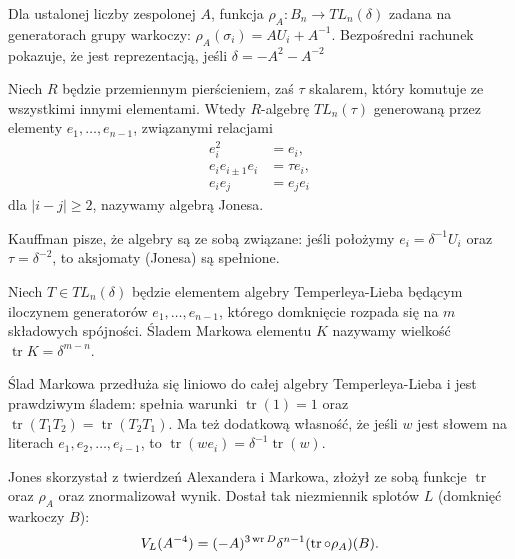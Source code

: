 Dla ustalonej liczby zespolonej $A$, funkcja $\rho_A \colon B_n \to TL_n(\delta)$ zadana na generatorach grupy warkoczy: $\rho_A(\sigma_i) = AU_i + A^{-1}$.
Bezpośredni rachunek pokazuje, że jest reprezentacją, jeśli $\delta = -A^2-A^{-2}$

\begin{definition}
%
    Niech $R$ będzie przemiennym pierścieniem, zaś $\tau$ skalarem, który komutuje ze wszystkimi innymi elementami.
    Wtedy $R$-algebrę $TL_n(\tau)$ generowaną przez elementy $e_1, \ldots, e_{n-1}$, związanymi relacjami
    \begin{align}
        e_i^2 & = e_i, \\
        e_i e_{i \pm 1} e_i & = \tau e_i, \\
        e_i e_j & = e_j e_i
    \end{align}
    dla $|i-j| \ge 2$, nazywamy algebrą Jonesa.
\end{definition}

Kauffman pisze, że algebry są ze sobą związane: jeśli położymy $e_i = \delta^{-1} U_i$ oraz $\tau = \delta^{-2}$, to aksjomaty (Jonesa) są spełnione.

\begin{definition}
%
    Niech $T \in TL_n(\delta)$ będzie elementem algebry Temperleya-Lieba będącym iloczynem generatorów $e_1, \ldots, e_{n-1}$, którego domknięcie rozpada się na $m$ składowych spójności.
    Śladem Markowa elementu $K$ nazywamy wielkość $\operatorname{tr} K = \delta^{m-n}$.
\end{definition}

Ślad Markowa przedłuża się liniowo do całej algebry Temperleya-Lieba i jest prawdziwym śladem: spełnia warunki $\operatorname{tr} (1) = 1$ oraz $\operatorname{tr} (T_1T_2) = \operatorname{tr} (T_2T_1)$.
Ma też dodatkową własność, że jeśli $w$ jest słowem na literach $e_1, e_2, \ldots, e_{i-1}$, to $\operatorname{tr}(we_i) = \delta^{-1} \operatorname{tr} (w)$.

Jones skorzystał z twierdzeń Alexandera i Markowa, złożył ze sobą funkcje $\operatorname{tr}$ oraz $\rho_A$ oraz znormalizował wynik.
Dostał tak niezmiennik splotów $L$ (domknięć warkoczy $B$):
\begin{equation}
    V_L(A^{-4}) = (-A)^{3 \operatorname{wr} D} \delta^{n-1} (\operatorname{tr} \circ \rho_A)(B).
\end{equation}

